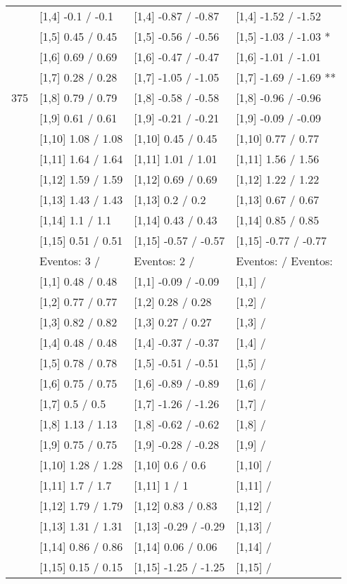 \begin{table}
\begin{tabular}[t]{llll}
\addlinespace
 & {}[1,4] -0.1  / -0.1 & {}[1,4] -0.87  / -0.87 & {}[1,4] -1.52  / -1.52\\
 & {}[1,5] 0.45  / 0.45 & {}[1,5] -0.56  / -0.56 & {}[1,5] -1.03  / -1.03 *\\
 & {}[1,6] 0.69  / 0.69 & {}[1,6] -0.47  / -0.47 & {}[1,6] -1.01  / -1.01\\
 & {}[1,7] 0.28  / 0.28 & {}[1,7] -1.05  / -1.05 & {}[1,7] -1.69  / -1.69 **\\
375 & {}[1,8] 0.79  / 0.79 & {}[1,8] -0.58  / -0.58 & {}[1,8] -0.96  / -0.96\\
\addlinespace
 & {}[1,9] 0.61  / 0.61 & {}[1,9] -0.21  / -0.21 & {}[1,9] -0.09  / -0.09\\
 & {}[1,10] 1.08  / 1.08 & {}[1,10] 0.45  / 0.45 & {}[1,10] 0.77  / 0.77\\
 & {}[1,11] 1.64  / 1.64 & {}[1,11] 1.01  / 1.01 & {}[1,11] 1.56  / 1.56\\
 & {}[1,12] 1.59  / 1.59 & {}[1,12] 0.69  / 0.69 & {}[1,12] 1.22  / 1.22\\
 & {}[1,13] 1.43  / 1.43 & {}[1,13] 0.2  / 0.2 & {}[1,13] 0.67  / 0.67\\
\addlinespace
 & {}[1,14] 1.1  / 1.1 & {}[1,14] 0.43  / 0.43 & {}[1,14] 0.85  / 0.85\\
 & {}[1,15] 0.51  / 0.51 & {}[1,15] -0.57  / -0.57 & {}[1,15] -0.77  / -0.77\\
 & Eventos:  3 / & Eventos:  2 / & Eventos:   / Eventos:\\
 & {}[1,1] 0.48  / 0.48 & {}[1,1] -0.09  / -0.09 & {}[1,1]  /\\
 & {}[1,2] 0.77  / 0.77 & {}[1,2] 0.28  / 0.28 & {}[1,2]  /\\
\addlinespace
 & {}[1,3] 0.82  / 0.82 & {}[1,3] 0.27  / 0.27 & {}[1,3]  /\\
 & {}[1,4] 0.48  / 0.48 & {}[1,4] -0.37  / -0.37 & {}[1,4]  /\\
 & {}[1,5] 0.78  / 0.78 & {}[1,5] -0.51  / -0.51 & {}[1,5]  /\\
 & {}[1,6] 0.75  / 0.75 & {}[1,6] -0.89  / -0.89 & {}[1,6]  /\\
 & {}[1,7] 0.5  / 0.5 & {}[1,7] -1.26  / -1.26 & {}[1,7]  /\\
\addlinespace
500 & {}[1,8] 1.13  / 1.13 & {}[1,8] -0.62  / -0.62 & {}[1,8]  /\\
 & {}[1,9] 0.75  / 0.75 & {}[1,9] -0.28  / -0.28 & {}[1,9]  /\\
 & {}[1,10] 1.28  / 1.28 & {}[1,10] 0.6  / 0.6 & {}[1,10]  /\\
 & {}[1,11] 1.7  / 1.7 & {}[1,11] 1  / 1 & {}[1,11]  /\\
 & {}[1,12] 1.79  / 1.79 & {}[1,12] 0.83  / 0.83 & {}[1,12]  /\\
\addlinespace
 & {}[1,13] 1.31  / 1.31 & {}[1,13] -0.29  / -0.29 & {}[1,13]  /\\
 & {}[1,14] 0.86  / 0.86 & {}[1,14] 0.06  / 0.06 & {}[1,14]  /\\
 & {}[1,15] 0.15  / 0.15 & {}[1,15] -1.25  / -1.25 & {}[1,15]  /\\
\bottomrule
\end{tabular}
\end{table}
